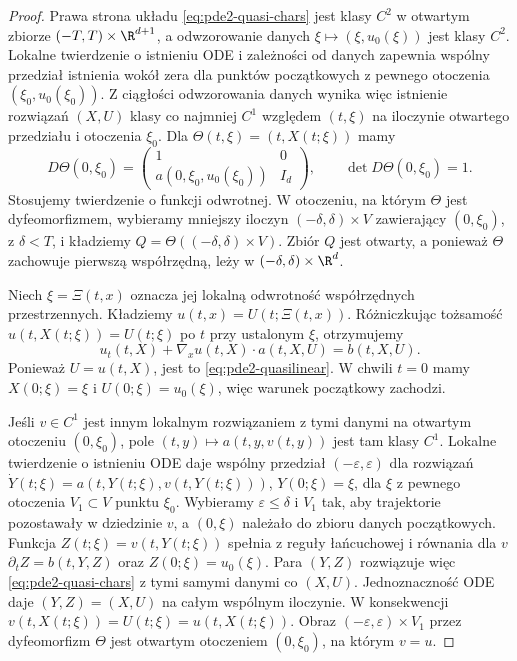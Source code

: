 \begin{proof}
Prawa strona układu \eqref{eq:pde2-quasi-chars}
jest klasy $C^2$ w otwartym zbiorze
$(-T,T)\times\R^{d+1}$, a odwzorowanie danych
$\xi\mapsto(\xi,u_0(\xi))$ jest klasy $C^2$.
Lokalne twierdzenie o istnieniu ODE i zależności od danych
zapewnia wspólny przedział istnienia wokół zera dla
punktów początkowych z pewnego otoczenia
$(\xi_0,u_0(\xi_0))$. Z ciągłości odwzorowania danych
wynika więc istnienie rozwiązań $(X,U)$ klasy co najmniej
$C^1$ względem $(t,\xi)$ na iloczynie otwartego przedziału
i otoczenia $\xi_0$.
Dla $\Theta(t,\xi)=(t,X(t;\xi))$ mamy
\[
 D\Theta(0,\xi_0)=
 \begin{pmatrix}1&0\\
 a(0,\xi_0,u_0(\xi_0))&I_d
 \end{pmatrix},
 \qquad \det D\Theta(0,\xi_0)=1.
\]
Stosujemy twierdzenie o funkcji odwrotnej. W otoczeniu,
na którym $\Theta$ jest dyfeomorfizmem, wybieramy mniejszy
iloczyn $(-\delta,\delta)\times V$ zawierający $(0,\xi_0)$,
z $\delta<T$, i kładziemy $Q=\Theta((-\delta,\delta)\times V)$.
Zbiór $Q$ jest otwarty, a ponieważ $\Theta$ zachowuje
pierwszą współrzędną, leży w $(-\delta,\delta)\times\R^d$.

Niech $\xi=\Xi(t,x)$ oznacza jej lokalną odwrotność
współrzędnych przestrzennych. Kładziemy
$u(t,x)=U(t;\Xi(t,x))$. Różniczkując tożsamość
$u(t,X(t;\xi))=U(t;\xi)$ po $t$ przy ustalonym $\xi$,
otrzymujemy
\[
 u_t(t,X)+\nabla_xu(t,X)\cdot a(t,X,U)
 =b(t,X,U).
\]
Ponieważ $U=u(t,X)$, jest to \eqref{eq:pde2-quasilinear}.
W chwili $t=0$ mamy $X(0;\xi)=\xi$ i
$U(0;\xi)=u_0(\xi)$, więc warunek początkowy zachodzi.

Jeśli $v\in C^1$ jest innym lokalnym rozwiązaniem z tymi
danymi na otwartym otoczeniu $(0,\xi_0)$, pole
$(t,y)\mapsto a(t,y,v(t,y))$ jest tam klasy $C^1$.
Lokalne twierdzenie o istnieniu ODE daje wspólny przedział
$(-\varepsilon,\varepsilon)$ dla rozwiązań
$\dot Y(t;\xi)=a(t,Y(t;\xi),v(t,Y(t;\xi)))$,
$Y(0;\xi)=\xi$, dla $\xi$ z pewnego otoczenia $V_1\subset V$
punktu $\xi_0$. Wybieramy $\varepsilon\le\delta$ i $V_1$
tak, aby trajektorie pozostawały w dziedzinie $v$,
a $(0,\xi)$ należało do zbioru danych początkowych.
Funkcja $Z(t;\xi)=v(t,Y(t;\xi))$ spełnia z reguły
łańcuchowej i równania dla $v$
$\partial_t Z=b(t,Y,Z)$ oraz $Z(0;\xi)=u_0(\xi)$.
Para $(Y,Z)$ rozwiązuje więc \eqref{eq:pde2-quasi-chars}
z tymi samymi danymi co $(X,U)$. Jednoznaczność ODE daje
$(Y,Z)=(X,U)$ na całym wspólnym iloczynie.
W konsekwencji $v(t,X(t;\xi))=U(t;\xi)=u(t,X(t;\xi))$.
Obraz $(-\varepsilon,\varepsilon)\times V_1$ przez
dyfeomorfizm $\Theta$ jest otwartym otoczeniem $(0,\xi_0)$,
na którym $v=u$.
\end{proof}


